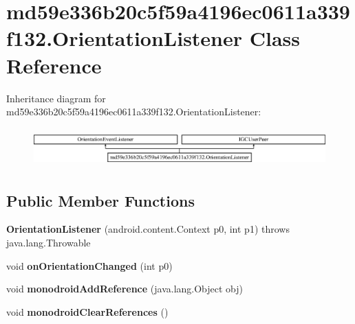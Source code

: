 \hypertarget{classmd59e336b20c5f59a4196ec0611a339f132_1_1OrientationListener}{}\section{md59e336b20c5f59a4196ec0611a339f132.\+Orientation\+Listener Class Reference}
\label{classmd59e336b20c5f59a4196ec0611a339f132_1_1OrientationListener}
Inheritance diagram for md59e336b20c5f59a4196ec0611a339f132.\+Orientation\+Listener\+:\begin{figure}[H]
\begin{center}
\leavevmode
\includegraphics[height=1.505376cm]{classmd59e336b20c5f59a4196ec0611a339f132_1_1OrientationListener}
\end{center}
\end{figure}
\subsection*{Public Member Functions}
\begin{DoxyCompactItemize}
\item 
\mbox{\label{classmd59e336b20c5f59a4196ec0611a339f132_1_1OrientationListener_aa5234dd53a55bb1b65af5aa559c74f75}} 
{\bfseries Orientation\+Listener} (android.\+content.\+Context p0, int p1)  throws java.\+lang.\+Throwable 	
\item 
\mbox{\label{classmd59e336b20c5f59a4196ec0611a339f132_1_1OrientationListener_a4cfcf18b901c413bcc04a98ee5de599b}} 
void {\bfseries on\+Orientation\+Changed} (int p0)
\item 
\mbox{\label{classmd59e336b20c5f59a4196ec0611a339f132_1_1OrientationListener_a6102ae050838f716aa7ea65ce2d43ae3}} 
void {\bfseries monodroid\+Add\+Reference} (java.\+lang.\+Object obj)
\item 
\mbox{\label{classmd59e336b20c5f59a4196ec0611a339f132_1_1OrientationListener_a324c55f4b5ec781f1a163256ee93b6ad}} 
void {\bfseries monodroid\+Clear\+References} ()
\end{DoxyCompactItemize}
